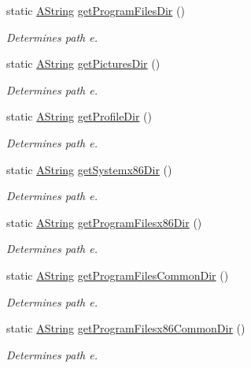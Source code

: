 \begin{DoxyCompactItemize}
static \mbox{\hyperlink{class_a_string}{A\+String}} \mbox{\hyperlink{class_dir_ab19d6650f6e56f91c3b16b9523bc70d0}{get\+Program\+Files\+Dir}} ()
\begin{DoxyCompactList}\small\item\em Determines path e. \end{DoxyCompactList}\item 
static \mbox{\hyperlink{class_a_string}{A\+String}} \mbox{\hyperlink{class_dir_a63c22c3f3fa2afeb2d7b789493975145}{get\+Pictures\+Dir}} ()
\begin{DoxyCompactList}\small\item\em Determines path e. \end{DoxyCompactList}\item 
static \mbox{\hyperlink{class_a_string}{A\+String}} \mbox{\hyperlink{class_dir_ab68e6294a2441934672c6c6348df1e74}{get\+Profile\+Dir}} ()
\begin{DoxyCompactList}\small\item\em Determines path e. \end{DoxyCompactList}\item 
static \mbox{\hyperlink{class_a_string}{A\+String}} \mbox{\hyperlink{class_dir_ad5830bd5aeb84c7c15751e1d49dbcde0}{get\+Systemx86\+Dir}} ()
\begin{DoxyCompactList}\small\item\em Determines path e. \end{DoxyCompactList}\item 
static \mbox{\hyperlink{class_a_string}{A\+String}} \mbox{\hyperlink{class_dir_a24c088c429ae9a480111b94218605dc4}{get\+Program\+Filesx86\+Dir}} ()
\begin{DoxyCompactList}\small\item\em Determines path e. \end{DoxyCompactList}\item 
static \mbox{\hyperlink{class_a_string}{A\+String}} \mbox{\hyperlink{class_dir_a7348309552c3286c53000f645e4545e8}{get\+Program\+Files\+Common\+Dir}} ()
\begin{DoxyCompactList}\small\item\em Determines path e. \end{DoxyCompactList}\item 
static \mbox{\hyperlink{class_a_string}{A\+String}} \mbox{\hyperlink{class_dir_ae6a11abee4d5eeed4ddc784b498aaff2}{get\+Program\+Filesx86\+Common\+Dir}} ()
\begin{DoxyCompactList}\small\item\em Determines path e. \end{DoxyCompactList}\item 

\end{DoxyCompactItemize}
